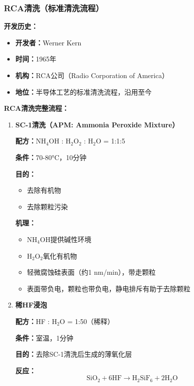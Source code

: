 \documentclass[UTF8,12pt,a4paper]{ctexart}
\begin{document}
\subsubsection{RCA清洗（标准清洗流程）}

\textbf{开发历史：}
\begin{itemize}
    \item \textbf{开发者：}Werner Kern
    \item \textbf{时间：}1965年
    \item \textbf{机构：}RCA公司（Radio Corporation of America）
    \item \textbf{地位：}半导体工艺的标准清洗流程，沿用至今
\end{itemize}

\textbf{RCA清洗完整流程：}

\begin{enumerate}
    \item \textbf{SC-1清洗（APM: Ammonia Peroxide Mixture）}
    
    \textbf{配方：}NH$_4$OH : H$_2$O$_2$ : H$_2$O = 1:1:5
    
    \textbf{条件：}70-80°C，10分钟
    
    \textbf{目的：}
    \begin{itemize}
        \item 去除有机物
        \item 去除颗粒污染
    \end{itemize}
    
    \textbf{机理：}
    \begin{itemize}
        \item NH$_4$OH提供碱性环境
        \item H$_2$O$_2$氧化有机物
        \item 轻微腐蚀硅表面（约1 nm/min），带走颗粒
        \item 表面带负电，颗粒也带负电，静电排斥有助于去除颗粒
    \end{itemize}
    
    \item \textbf{稀HF浸泡}
    
    \textbf{配方：}HF : H$_2$O = 1:50（稀释）
    
    \textbf{条件：}室温，1分钟
    
    \textbf{目的：}去除SC-1清洗后生成的薄氧化层
    
    \textbf{反应：}
    \begin{equation}
    \text{SiO}_2 + 6\text{HF} \rightarrow \text{H}_2\text{SiF}_6 + 2\text{H}_2\text{O}
    \end{equation}
    

\end{enumerate}
\end{document}
